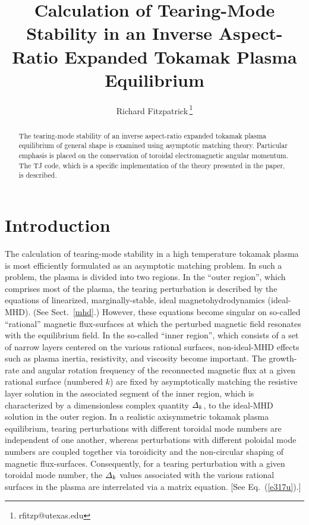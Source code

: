 \documentclass[12pt,prb,aps]{revtex4-1}
\begin{document}
\title{Calculation of Tearing-Mode Stability in an Inverse Aspect-Ratio Expanded Tokamak Plasma Equilibrium}
\author{Richard Fitzpatrick\,\footnote{rfitzp@utexas.edu}}

\begin{abstract}
The   tearing-mode stability of an inverse aspect-ratio expanded tokamak plasma equilibrium of general
shape  is examined using asymptotic matching theory. Particular emphasis is placed on the
conservation of toroidal electromagnetic angular momentum. The TJ code, which is a specific implementation of the
theory presented  in the paper, is described. 
\end{abstract}
\maketitle

\section{Introduction} 
The calculation of tearing-mode stability in a high temperature tokamak plasma is most efficiently formulated as  an asymptotic
matching problem.\cite{fkr} In such a problem, the  plasma is  divided into two regions. In the ``outer region'', which comprises most
of the plasma, the tearing perturbation is described by the equations of linearized, marginally-stable, ideal magnetohydrodynamics (ideal-MHD). (See Sect.~\ref{mhd}.)
However, these equations become singular on so-called ``rational'' magnetic flux-surfaces at which the perturbed magnetic field resonates with the equilibrium field. In the so-called ``inner region'', which
consists of a set of narrow layers centered on the various rational surfaces, non-ideal-MHD effects such as plasma inertia, resistivity, and
viscosity become important. The growth-rate and angular rotation frequency of the reconnected magnetic flux at a given rational
surface (numbered $k$) are fixed by asymptotically matching the resistive layer
solution in the associated segment of the inner region, which is characterized by a dimensionless complex quantity ${\mit\Delta}_k$,  to the ideal-MHD solution in the outer region. In a realistic axisymmetric tokamak  plasma equilibrium, tearing
perturbations with different toroidal mode numbers are independent of one another, whereas perturbations with different poloidal
mode numbers are coupled together via toroidicity and the non-circular shaping of magnetic flux-surfaces.\cite{con0}
Consequently, for a tearing perturbation with a given toroidal mode number, 
 the ${\mit\Delta}_k$ values associated with  the various rational surfaces in the plasma are interrelated via a matrix equation.\cite{connor,cht,tokuda,brennan, ham,am1,am3} [See Eq.~(\ref{e317u}).]
\end{document}
